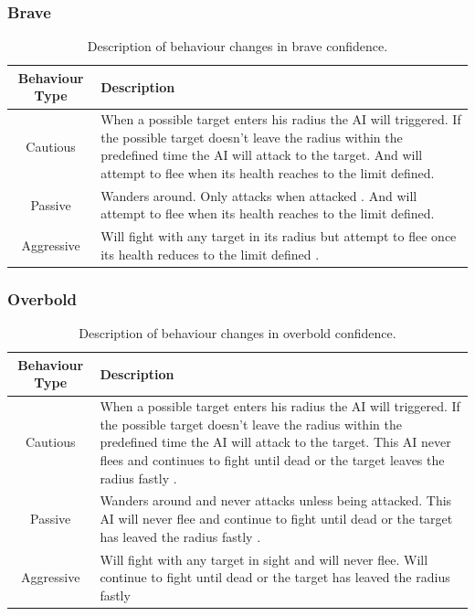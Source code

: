 \subsubsection{Brave}

\begin{table}[ht]
    \centering
    \begin{tabular}{|c|L|}
         \hline 
         Behaviour Type   & Description  \\
         \hline
         Cautious    &  When a possible target enters his radius the AI will triggered. If the possible target doesn't leave the radius within the predefined time the AI will attack to the target. And will attempt to flee when its health reaches to the limit defined. \\
         \hline
         Passive    &     Wanders around. Only attacks when attacked . And will attempt to flee when its health reaches to the limit defined. \\
         \hline
         Aggressive & Will fight with any target in its radius but attempt to flee once its health reduces to the limit defined . \\
         \hline 

    \end{tabular}
    \hfill
    \caption{Description of behaviour changes in brave confidence.}
    \label{tab:brave}
\end{table}

\newpage

\subsubsection{Overbold}

\begin{table}[ht]
    \centering
    \begin{tabular}{|c|L|}
         \hline 
         Behaviour Type   & Description  \\
         \hline
         Cautious    & When a possible target enters his radius the AI will triggered. If the possible target doesn't leave the radius within the predefined time the AI will attack to the target. This AI never flees and continues to fight until dead or the target leaves the radius fastly . \\
         \hline
         Passive    &  Wanders around and never attacks unless being attacked. This AI will never flee and continue to fight until dead or the target has leaved the radius fastly .\\
         \hline
         Aggressive & Will fight with any target in sight and will never flee. Will continue to fight until dead or the target has leaved the radius fastly  \\
         \hline 

    \end{tabular}
    \hfill
    \caption{Description of behaviour changes in overbold confidence.}
    \label{tab:overbold}
\end{table}

